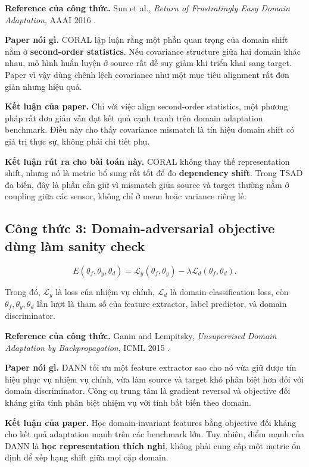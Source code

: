 \documentclass[a4paper]{article}
\begin{document}
	\textbf{Reference của công thức.} Sun et al., \emph{Return of Frustratingly Easy Domain Adaptation}, AAAI 2016 \cite{coral}.

	\textbf{Paper nói gì.} CORAL lập luận rằng một phần quan trọng của domain shift nằm ở \textbf{second-order statistics}. Nếu covariance structure giữa hai domain khác nhau, mô hình huấn luyện ở source rất dễ suy giảm khi triển khai sang target. Paper vì vậy dùng chênh lệch covariance như một mục tiêu alignment rất đơn giản nhưng hiệu quả.

	\textbf{Kết luận của paper.} Chỉ với việc align second-order statistics, một phương pháp rất đơn giản vẫn đạt kết quả cạnh tranh trên domain adaptation benchmark. Điều này cho thấy covariance mismatch là tín hiệu domain shift có giá trị thực sự, không phải chi tiết phụ.

	\textbf{Kết luận rút ra cho bài toán này.} CORAL không thay thế representation shift, nhưng nó là metric bổ sung rất tốt để đo \textbf{dependency shift}. Trong TSAD đa biến, đây là phần cần giữ vì mismatch giữa source và target thường nằm ở coupling giữa các sensor, không chỉ ở mean hoặc variance riêng lẻ.

\subsection{Công thức 3: Domain-adversarial objective dùng làm sanity check}

\[
E(\theta_f,\theta_y,\theta_d)
= \mathcal{L}_y(\theta_f,\theta_y)
- \lambda \mathcal{L}_d(\theta_f,\theta_d).
\]

Trong đó, \(\mathcal{L}_y\) là loss của nhiệm vụ chính, \(\mathcal{L}_d\) là domain-classification loss, còn \(\theta_f, \theta_y, \theta_d\) lần lượt là tham số của feature extractor, label predictor, và domain discriminator.

	\textbf{Reference của công thức.} Ganin and Lempitsky, \emph{Unsupervised Domain Adaptation by Backpropagation}, ICML 2015 \cite{dann}.

	\textbf{Paper nói gì.} DANN tối ưu một feature extractor sao cho nó vừa giữ được tín hiệu phục vụ nhiệm vụ chính, vừa làm source và target khó phân biệt hơn đối với domain discriminator. Công cụ trung tâm là gradient reversal và objective đối kháng giữa tính phân biệt nhiệm vụ với tính bất biến theo domain.

	\textbf{Kết luận của paper.} Học domain-invariant features bằng objective đối kháng cho kết quả adaptation mạnh trên các benchmark lớn. Tuy nhiên, điểm mạnh của DANN là \textbf{học representation thích nghi}, không phải cung cấp một metric ổn định để xếp hạng shift giữa mọi cặp domain.
\end{document}
